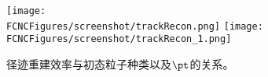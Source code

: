 \begin{figure}[H]
\centering
\texttt{[image: \\FCNCFigures/screenshot/trackRecon.png]}
\texttt{[image: \\FCNCFigures/screenshot/trackRecon\_1.png]}
\caption{径迹重建效率与初态粒子种类以及$\pt$的关系。}
\label{fig:trackRecon}
\end{figure}